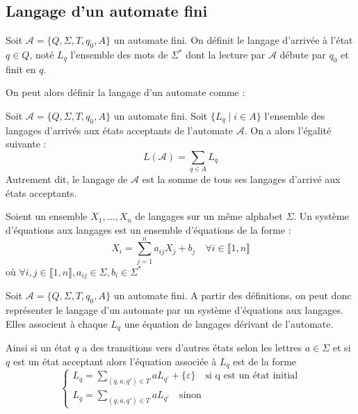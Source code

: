 \subsection{Langage d'un automate fini}

\begin{definition}
    Soit $ \mathcal{A} = \{Q, \Sigma, T, q_0, A\}$ un automate fini. On définit le langage d'arrivée à l'état $ q \in Q$, 
    noté $ L_q$ l'ensemble des mots de $ \Sigma^*$ dont la lecture par $ \mathcal{A}$ débute par $q_0$ et finit en $q$. 
\end{definition}

On peut alors définir la langage d'un automate comme :

\begin{proposition}
    Soit $ \mathcal{A} = \{Q, \Sigma, T, q_0, A\}$ un automate fini. Soit $\{L_q \; | \; i \in A \}$ 
    l'ensemble des langages d'arrivés aux états acceptants de l'automate $ \mathcal{A}$. On a alors l'égalité suivante : 
        \[ L( \mathcal{A}) = \sum_{q \in A} L_q \]
    Autrement dit, le langage de $ \mathcal{A}$ est la somme de tous ses langages d'arrivé aux états acceptants. 
\end{proposition}

\begin{definition}
    Soient un ensemble $X_1, \dots, X_n$ de langages sur un même alphabet $\Sigma$. 
    Un système d'équations aux langages est un ensemble d'équations de la forme : 
        \[ X_i = \sum_{j=1}^{n} a_{ij} X_j + b_j \quad \forall i \in \llbracket 1, n \rrbracket \] 
    où $ \forall i,j \in \llbracket 1, n \rrbracket, a_{ij} \in \Sigma, b_i \in \Sigma^*$
\end{definition}

\begin{proposition}
    Soit $ \mathcal{A} = \{Q, \Sigma, T, q_0, A\}$ un automate fini.
    A partir des définitions, on peut donc représenter le langage d'un automate par un système d'équations aux langages. 
    Elles associent à chaque $L_q$ une équation de langages dérivant de l'automate. 
    
    \vspace{0.2cm}
    
    Ainsi si un état $q$ a des transitions vers d'autres états selon les lettres $a \in \Sigma$ et si $q$ est un état 
    acceptant alors l'équation associée à $L_q$ est de la forme 
        \[ 
            \begin{cases}
                L_q = \sum_{(q,a,q') \in T} a L_{q'} + \{\varepsilon\}  \quad \text{si q est un état initial} \\ 
                L_q = \sum_{(q,a,q') \in T} a L_{q'} \quad \text{sinon}
            \end{cases}
        \] 
\end{proposition}

